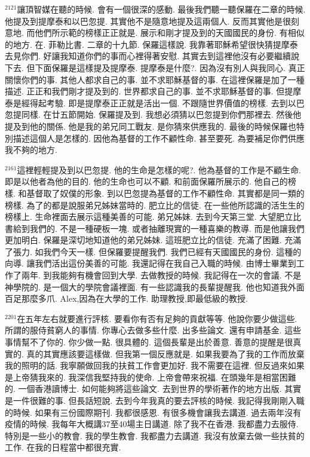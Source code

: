 \documentclass{book}
\begin{document}
$^{2121}$讓頂智媒在聽的時候.
會有一個很深的感動.
最後我們聽一聽保羅在二章的時候.
他提及到提摩泰和以巴忽提.
其實他不是隨意地提及這兩個人.
反而其實他是很刻意地.
而他們所示範的榜樣正正就是.
展示和剛才提及到的天國國民的身份.
有相似的地方.
在.
菲勒比書.
二章的十九節.
保羅這樣說.
我靠著耶穌希望很快猜提摩泰去見你們.
好讓我知道你們的事而心裡得著安慰.
其實去到這裡他沒有必要繼續說下去.
但下面保羅是這樣提及提摩泰.
提摩泰是什麼?.
因為沒有別人與我同心.
真正關懷你們的事.
其他人都求自己的事.
並不求耶穌基督的事.
在這裡保羅是加了一種描述.
正正和我們剛才提及到的.
世界都求自己的事.
並不求耶穌基督的事.
但提摩泰是經得起考驗.
即是提摩泰正正就是活出一個.
不跟隨世界價值的榜樣.
去到以巴忽提同樣.
在廿五節開始.
保羅提及到.
我想必須猜以巴忽提到你們那裡去.
然後他提及到他的關係.
他是我的弟兄同工戰友.
是你猜來供應我的.
最後的時候保羅也特別描述這個人是怎樣的.
因他為基督的工作不顧性命.
甚至要死.
為要補足你們供應我不夠的地方.

$^{2161}$這裡輕輕提及到以巴忽提.
他的生命是怎樣的呢?.
他為基督的工作是不顧生命.
即是以他者為他的目的.
他的生命也可以不顧.
和前面保羅所展示的.
他自己的榜樣.
和基督取了奴僕的形象.
到以巴忽提為基督的工作不顧性命.
其實都是同一類的榜樣.
為了的都是說服弟兄姊妹當時的.
肥立比的信徒.
在一些他所認識的活生生的榜樣上.
生命裡面去展示這種美善的可能.
弟兄姊妹.
去到今天第三堂.
大望肥立比書給到我們的.
不是一種硬板一塊.
或者抽離現實的一種喜樂的教導.
而是他讓我們更加明白.
保羅是深切地知道他的弟兄姊妹.
這班肥立比的信徒.
充滿了困難.
充滿了張力.
如我們今天一樣.
但保羅要提醒我們.
我們已經有天國國民的身份.
這種的向導.
讓我們活出這份美善的可能.
我還記得在我自己入職的時候.
由博士畢業到工作了兩年.
到我能夠有機會回到大學.
去做教授的時候.
我記得在一次的會議.
不是神學院的.
是一個大的學院會議裡面.
有一些認識我的長輩提醒我.
他也知道我外面百足那麼多爪.
Alex,因為在大學的工作.
助理教授,即最低級的教授.

$^{2201}$在五年左右就要進行評核.
要看你有否有足夠的貢獻等等.
他說你要少做這些.
所謂的服侍貧窮人的事情.
你專心去做多些什麼.
出多些論文.
還有申請基金.
這些事情幫不了你的.
你少做一點.
很具體的.
這個長輩是出於善意.
善意的提醒是很真實的.
真的其實應該要這樣做.
但我第一個反應就是.
如果我要為了我的工作而放棄我的照明的話.
我寧願做回我的扶貧工作會更加好.
我不需要在這裡.
但反過來如果是上帝猜我來的.
我深信我堅持我的使命.
上帝會帶來祝福.
在頭幾年是相當困難的.
一個香港讀博士.
如何能夠將這些論文.
去到世界的學術著作的地方出版.
其實是一件很難的事.
但長話短說.
去到今年我真的要去評核的時候.
我記得我剛剛入職的時候.
如果有三份國際期刊.
我都很感恩.
有很多機會讓我去講道.
過去兩年沒有疫情的時候.
我每年大概講37至40場主日講道.
除了我不在香港.
我都盡力去服侍.
特別是一些小的教會.
我的學生教會.
我都盡力去講道.
我沒有放棄去做一些扶貧的工作.
在我的日程當中都很充實.
\end{document}
